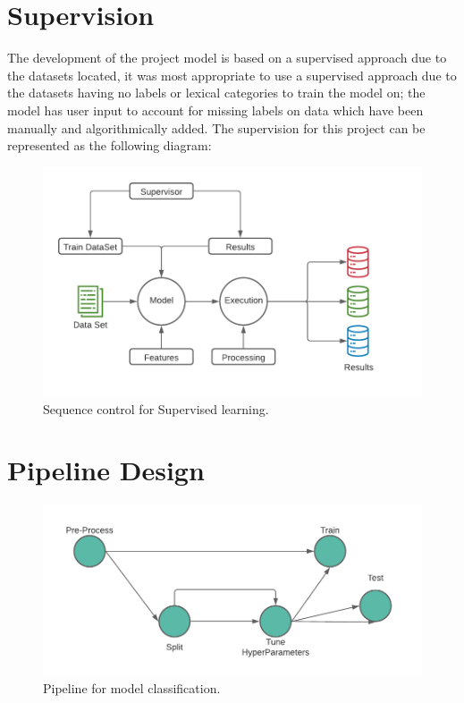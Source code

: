 \section{Supervision}

The development of the project model is based on a supervised approach due to the datasets located, it was most appropriate to use a supervised approach due to the datasets having no labels or lexical categories to train the model on; the model has user input to account for missing labels on data which have been manually and algorithmically added. The supervision for this project can be represented as the following diagram:

\begin{figure}[H]
    \centering
    \includegraphics[width=\textwidth]{figures/chapter-5/SupervisedLearningChart.pdf}
    \caption[SupervisedLearning]{Sequence control for Supervised learning.
    \label{fig:SupervisedLearningChart}}
\end{figure}

\section{Pipeline Design}

\begin{figure}[H]
    \centering
    \includegraphics[width=\textwidth]{figures/chapter-5/Pipeline.pdf}
    \caption[MLTCPipeline]{Pipeline for model classification.
    \label{fig:MLTCPipeline}}
\end{figure}

